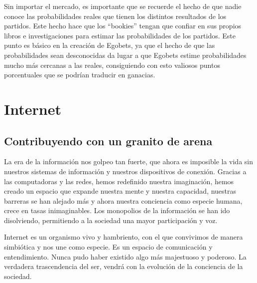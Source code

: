 Sin importar el mercado, es importante que se recuerde el hecho de que nadie conoce las probabilidades reales que tienen los distintos resultados de los partidos. Este hecho hace que los ``bookies'' tengan que confiar en sus propios libros e investigaciones para estimar las probabilidades de los partidos. Este punto es básico en la creación de Egobets, ya que el hecho de que las probabilidades sean desconocidas da lugar a que Egobets estime probabilidades mucho más cercanas a las reales, consiguiendo con esto valiosos puntos porcentuales que se podrían traducir en ganacias.





\section{Internet}
\subsection{Contribuyendo con un granito de arena}
La era de la información nos golpeo tan fuerte, que ahora es imposible la vida sin nuestros sistemas de información y nuestros dispositivos de conexión. Gracias a las computadoras y las redes, hemos redefinido nuestra imaginación, hemos creado un espacio que expande nuestra mente y nuestra capacidad, nuestras barreras se han alejado más y ahora nuestra conciencia como especie humana, crece en tasas inimaginables. Los monopolios de la información se han ido disolviendo, permitiendo a la sociedad una mayor participación y voz.

Internet es un organismo vivo y hambriento, con el que convivimos de manera simbiótica y nos une como especie. Es un espacio de comunicación y entendimiento. Nunca pudo haber existido algo más majestuoso y poderoso. La verdadera trascendencia del ser, vendrá con la evolución de la conciencia de la sociedad.

